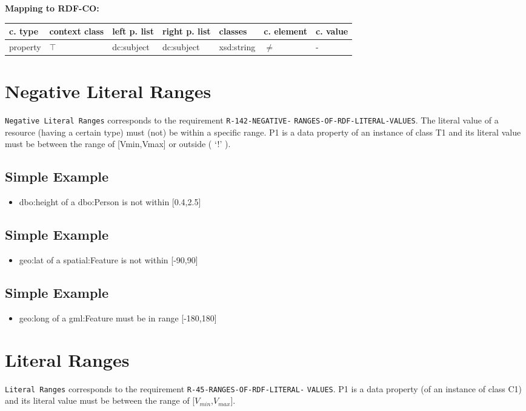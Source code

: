 \documentclass{llncs}
\newcommand{\ms}[1]{\texttt{#1}}
\newenvironment{gcotable}{
  \scriptsize
  \sffamily
  \vspace{0cm}
	\begin{center}
	\textbf{\vspace{0.4cm}Mapping to RDF-CO:} \\
  \begin{tabular}{l|l|l|l|l|l|l}
	\hline
  \textbf{c. type} & \textbf{context class} & \textbf{left p. list} & \textbf{right p. list} & \textbf{classes} & \textbf{c. element} & \textbf{c. value} \\
  \hline

}{
  \hline
  \end{tabular}
	\end{center}
}
\begin{document}
\begin{gcotable}
property & $\top$ & dc:subject & dc:subject & xsd:string & $\neq$ & - \\
\end{gcotable}

\section{Negative Literal Ranges}

\ms{Negative Literal Ranges} corresponds to the requirement
\ms{R-142-NEGATIVE-} \ms{RANGES-OF-RDF-LITERAL-VALUES}.
The literal value of a resource (having a certain type) must (not) be within a specific range.
P1 is a data property of an instance of class T1 and its literal value must be between the range of [Vmin,Vmax] or outside ( ‘!' ).

\subsection{Simple Example}

\begin{itemize}
	\item dbo:height of a dbo:Person is not within [0.4,2.5]
\end{itemize}

\subsection{Simple Example}

\begin{itemize}
	\item geo:lat of a spatial:Feature is not within [-90,90]
\end{itemize}

\subsection{Simple Example}

\begin{itemize}
	\item geo:long of a gml:Feature must be in range [-180,180]
\end{itemize}

\section{Literal Ranges}

\ms{Literal Ranges} corresponds to the requirement
\ms{R-45-RANGES-OF-RDF-LITERAL-} \ms{VALUES}.
P1 is a data property (of an instance of class C1) and its literal value must be between the range of [$V_{min}$,$V_{max}$].
\end{document}
